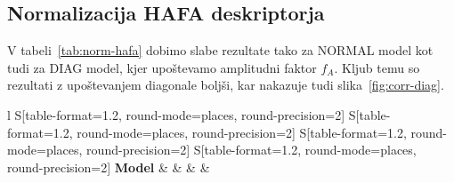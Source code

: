 \begin{comment}
\subsubsection{Jedro GHI}
\begin{table}[!htbp]
	\centering
	\begin{tabular}{l S[table-format=1.2, round-mode=places, round-precision=2] S[table-format=1.2, round-mode=places, round-precision=2] S[table-format=1.2, round-mode=places, round-precision=2] S[table-format=1.2, round-mode=places, round-precision=2]}
		\toprule
		\textbf{Model} & \thead{CORR} & \thead{RAE} & \thead{RRSE} & \thead{nSV} \\
		\midrule
		\bottomrule
	\end{tabular}
	\caption{Ghi vmax800}
	\label{tab:ghi}
\end{table}

\begin{figure}[!htbp]
	\centering
	\caption{Ghi best - eem-sv-lag(sv)}
	\label{fig:ghi}
\end{figure}
\end{comment}


\subsection{Normalizacija HAFA deskriptorja}
V tabeli~\ref{tab:norm-hafa} dobimo slabe rezultate tako za NORMAL model kot tudi za DIAG model, kjer upoštevamo amplitudni faktor $f_A$. Kljub temu so rezultati z upoštevanjem diagonale boljši, kar nakazuje tudi slika~\ref{fig:corr-diag}.

\begin{table}[!htbp]
	\centering
	\begin{tabular}{l S[table-format=1.2, round-mode=places, round-precision=2] S[table-format=1.2, round-mode=places, round-precision=2] S[table-format=1.2, round-mode=places, round-precision=2] S[table-format=1.2, round-mode=places, round-precision=2]}
		\toprule
		\textbf{Model} & \thead{\corr} & \thead{\rae} & \thead{\rrse} & \theadm{\nsv}\\
		\midrule
		\bottomrule
	\end{tabular}
	\caption[Evaluacijske metrike pri primerjavi modelov NORMAL in DIAG]{Evaluacijske metrike pri primerjavi modelov NORMAL in DIAG, kjer upoštevamo amplitudni faktor $f_A$. }
	\label{tab:norm-hafa}
\end{table}

